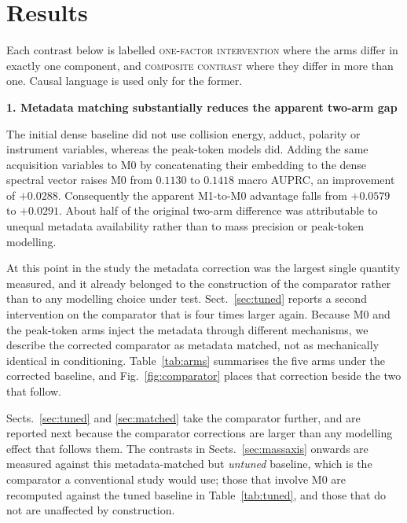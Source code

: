 \documentclass[11pt]{article}
\newcommand{\hd}[1]{\medskip\par\noindent\textbf{#1}\par\nobreak\vspace{2pt}\noindent\ignorespaces}
\newcommand{\onefactor}{{\normalfont\scshape one-factor intervention}}
\newcommand{\composite}{{\normalfont\scshape composite contrast}}
\begin{document}
\section*{Results}
Each contrast below is labelled \onefactor{} where the arms differ in exactly one component, and \composite{} where they differ in more than one. Causal language is used only for the former.

\hd{1. Metadata matching substantially reduces the apparent two-arm gap}
The initial dense baseline did not use collision energy, adduct, polarity or instrument variables, whereas the peak-token models did. Adding the same acquisition variables to M0 by concatenating their embedding to the dense spectral vector raises M0 from $0.1130$ to $0.1418$ macro AUPRC, an improvement of $+0.0288$. Consequently the apparent M1-to-M0 advantage falls from $+0.0579$ to $+0.0291$. About half of the original two-arm difference was attributable to unequal metadata availability rather than to mass precision or peak-token modelling.

At this point in the study the metadata correction was the largest single quantity measured, and it already belonged to the construction of the comparator rather than to any modelling choice under test. Sect.~\ref{sec:tuned} reports a second intervention on the comparator that is four times larger again. Because M0 and the peak-token arms inject the metadata through different mechanisms, we describe the corrected comparator as metadata matched, not as mechanically identical in conditioning. Table~\ref{tab:arms} summarises the five arms under the corrected baseline, and
Fig.~\ref{fig:comparator} places that correction beside the two that follow.

Sects.~\ref{sec:tuned} and \ref{sec:matched} take the comparator further, and are
reported next because the comparator corrections are larger than any modelling effect
that follows them. The contrasts in Sects.~\ref{sec:massaxis} onwards are measured
against this metadata-matched but \emph{untuned} baseline, which is the comparator a
conventional study would use; those that involve M0 are recomputed against the tuned
baseline in Table~\ref{tab:tuned}, and those that do not are unaffected by
construction.
\end{document}
